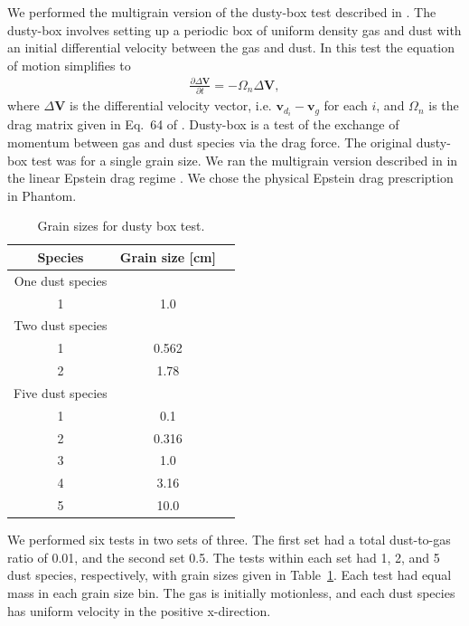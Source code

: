 \documentclass[fleqn,usenatbib]{mnras}
\let\vec\mathbf
\begin{document}
We performed the multigrain version of the dusty-box test described in
\citet{Laibe2011MNRAS.418.1491L}. The dusty-box involves setting up a periodic
box of uniform density gas and dust with an initial differential velocity
between the gas and dust. In this test the equation of motion simplifies to
%
\begin{align}
   \frac{\partial \Delta \vec{V}}{\partial t} = - \Omega_n \Delta \vec{V},
\end{align}
%
where \(\Delta \vec{V}\) is the differential velocity vector, i.e.
\(\vec{v}_{d_i} - \vec{v}_g\) for each \(i\), and \(\Omega_n\) is the drag
matrix given in Eq.~64 of \citet{Laibe2014MNRAS.444.1940L}. Dusty-box is a test
of the exchange of momentum between gas and dust species via the drag force. The
original dusty-box test was for a single grain size. We ran the multigrain
version described in \citet{Laibe2014MNRAS.444.1940L} in the linear Epstein drag
regime \citep{Epstein1924PhRv...23..710E}. We chose the physical Epstein drag
prescription in Phantom.

\begin{table}
   \centering
   \begin{tabular}{ccc}
      \hline
      \hline
      Species & Grain size [cm] \\
      \hline
      \hline
      One dust species \\
      1 & 1.0 \\
      \hline
      Two dust species \\
      1 & 0.562 \\
      2 & 1.78 \\
      \hline
      Five dust species \\
      1 & 0.1 \\
      2 & 0.316 \\
      3 & 1.0 \\
      4 & 3.16 \\
      5 & 10.0 \\
      \hline
      \hline
   \end{tabular}
   \caption{Grain sizes for dusty box test.}
   \label{tab:dustybox}
\end{table}

We performed six tests in two sets of three. The first set had a total
dust-to-gas ratio of 0.01, and the second set 0.5. The tests within each set had
1, 2, and 5 dust species, respectively, with grain sizes given in
Table~\ref{tab:dustybox}. Each test had equal mass in each grain size bin. The
gas is initially motionless, and each dust species has uniform velocity in the
positive x-direction.
\end{document}
